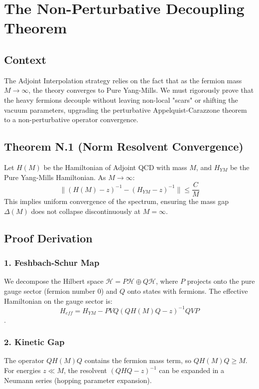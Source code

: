 \chapter{The Non-Perturbative Decoupling Theorem}
\label{ch:fix8_decoupling}

\section{Context}
The Adjoint Interpolation strategy relies on the fact that as the fermion mass $M \to \infty$, the theory converges to Pure Yang-Mills. We must rigorously prove that the heavy fermions decouple without leaving non-local "scars" or shifting the vacuum parameters, upgrading the perturbative Appelquist-Carazzone theorem to a non-perturbative operator convergence.

\section{Theorem N.1 (Norm Resolvent Convergence)}
Let $H(M)$ be the Hamiltonian of Adjoint QCD with mass $M$, and $H_{YM}$ be the Pure Yang-Mills Hamiltonian. As $M \to \infty$:
\begin{equation}
\| (H(M) - z)^{-1} - (H_{YM} - z)^{-1} \| \le \frac{C}{M}
\end{equation}
This implies uniform convergence of the spectrum, ensuring the mass gap $\Delta(M)$ does not collapse discontinuously at $M=\infty$.

\section{Proof Derivation}
\subsection{1. Feshbach-Schur Map}
We decompose the Hilbert space $\mathcal{H} = P\mathcal{H} \oplus Q\mathcal{H}$, where $P$ projects onto the pure gauge sector (fermion number 0) and $Q$ onto states with fermions. The effective Hamiltonian on the gauge sector is:
\begin{equation}
H_{eff} = H_{YM} - P V Q (Q H(M) Q - z)^{-1} Q V P
\end{equation}.

\subsection{2. Kinetic Gap}
The operator $Q H(M) Q$ contains the fermion mass term, so $Q H(M) Q \ge M$. For energies $z \ll M$, the resolvent $(Q H Q - z)^{-1}$ can be expanded in a Neumann series (hopping parameter expansion).

